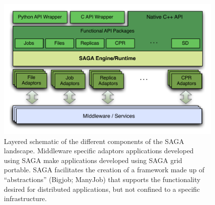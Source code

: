 \documentclass{acm_proc_article-sp}
\begin{document}
\begin{figure}[!ht]
\begin{center}
     \includegraphics[scale=0.53]{stci-saga-figures-1.pdf}
\end{center}
 \caption{\small Layered schematic of the different components
    of the SAGA landscape.  Middleware specific adaptors applications
    developed using SAGA make applications developed using SAGA grid
    portable. SAGA facilitates the
    creation of a framework made up of ``abstractions'' (Bigjob;
    ManyJob) that supports the functionality desired for distributed
    applications, but not confined to a specific infrastructure.}
 \label{sagalayer}
\end{figure}
\end{document}
